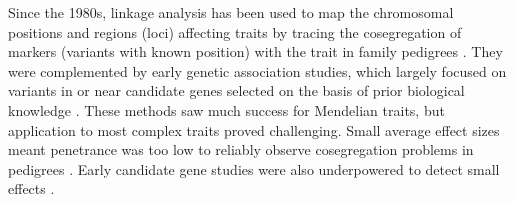 \begin{outline}
Since the 1980s, linkage analysis has been used to map the chromosomal positions and regions (loci) affecting traits by tracing the cosegregation of markers (variants with known position) with the trait in family pedigrees \autocite{altshuler2008GeneticMappingHuman,ott2011FamilybasedDesignsGenomewide,visscher2012FiveYearsGWAS}.
They were complemented by early genetic association studies, which largely focused on variants in or near candidate genes selected on the basis of prior biological knowledge \autocite{hirschhorn2002ComprehensiveReviewGenetic}.
These methods saw much success for Mendelian traits, but application to most complex traits proved challenging.
Small average effect sizes meant penetrance was too low to reliably observe cosegregation problems in pedigrees \autocite{visscher2012FiveYearsGWAS}.
Early candidate gene studies were also underpowered to detect small effects \autocite{border2019NoSupportHistorical}.


\end{outline}

